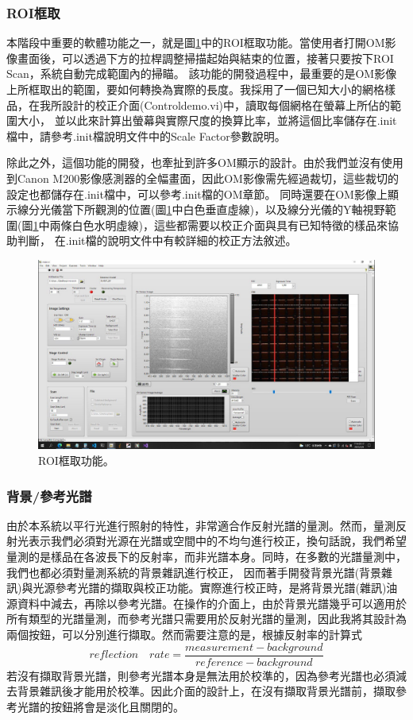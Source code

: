 \documentclass[12pt]{article}
\begin{document}
\subsubsection{ROI框取}
本階段中重要的軟體功能之一，就是圖\ref{figure: roi}中的ROI框取功能。當使用者打開OM影像畫面後，可以透過下方的拉桿調整掃描起始與結束的位置，接著只要按下ROI Scan，系統自動完成範圍內的掃瞄。
該功能的開發過程中，最重要的是OM影像上所框取出的範圍，要如何轉換為實際的長度。我採用了一個已知大小的網格樣品，在我所設計的校正介面(Control\textunderscore demo.vi)中，讀取每個網格在螢幕上所佔的範圍大小，
並以此來計算出螢幕與實際尺度的換算比率，並將這個比率儲存在.init檔中，請參考.init檔說明文件中的Scale Factor參數說明。

除此之外，這個功能的開發，也牽扯到許多OM顯示的設計。由於我們並沒有使用到Canon M200影像感測器的全幅畫面，因此OM影像需先經過裁切，這些裁切的設定也都儲存在.init檔中，可以參考.init檔的OM章節。
同時還要在OM影像上顯示線分光儀當下所觀測的位置(圖\ref{figure: roi}中白色垂直虛線)，以及線分光儀的Y軸視野範圍(圖\ref{figure: roi}中兩條白色水明虛線)，這些都需要以校正介面與具有已知特徵的樣品來協助判斷，
在.init檔的說明文件中有較詳細的校正方法敘述。
\begin{figure}
    \centering
    \includegraphics[width=\linewidth]{roi.jpeg}
    \caption{ROI框取功能。}
    \label{figure: roi}
\end{figure}

\subsubsection{背景/參考光譜}
由於本系統以平行光進行照射的特性，非常適合作反射光譜的量測。然而，量測反射光表示我們必須對光源在光譜或空間中的不均勻進行校正，換句話說，我們希望量測的是樣品在各波長下的反射率，而非光譜本身。同時，在多數的光譜量測中，我們也都必須對量測系統的背景雜訊進行校正，
因而著手開發背景光譜(背景雜訊)與光源參考光譜的擷取與校正功能。實際進行校正時，是將背景光譜(雜訊)油源資料中減去，再除以參考光譜。在操作的介面上，由於背景光譜幾乎可以適用於所有類型的光譜量測，而參考光譜只需要用於反射光譜的量測，因此我將其設計為兩個按鈕，可以分別進行擷取。然而需要注意的是，根據反射率的計算式
\begin{equation}\label{equation: reflection}
    reflection \quad rate=\frac{measurement-background}{reference-background}
\end{equation}
若沒有擷取背景光譜，則參考光譜本身是無法用於校準的，因為參考光譜也必須減去背景雜訊後才能用於校準。因此介面的設計上，在沒有擷取背景光譜前，擷取參考光譜的按鈕將會是淡化且關閉的。
\end{document}
